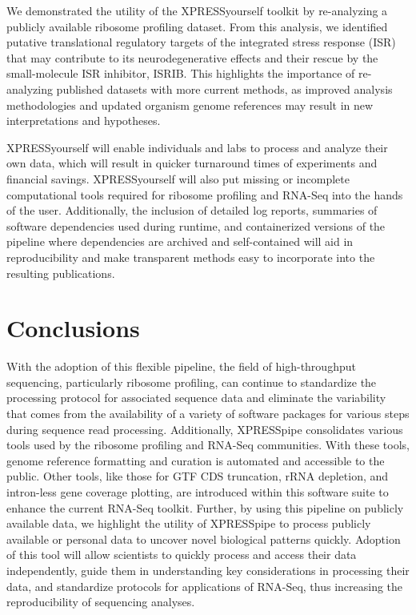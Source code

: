 \documentclass[10pt, oneside]{article}
\begin{document}
We demonstrated the utility of the XPRESSyourself toolkit by re-analyzing a publicly available ribosome profiling dataset. From this analysis, we identified putative translational regulatory targets of the integrated stress response (ISR) that may contribute to its neurodegenerative effects and their rescue by the small-molecule ISR inhibitor, ISRIB. This highlights the importance of re-analyzing published datasets with more current methods, as improved analysis methodologies and updated organism genome references may result in new interpretations and hypotheses. \par

XPRESSyourself will enable individuals and labs to process and analyze their own data, which will result in quicker turnaround times of experiments and financial savings. XPRESSyourself will also put missing or incomplete computational tools required for ribosome profiling and RNA-Seq into the hands of the user. Additionally, the inclusion of detailed log reports, summaries of software dependencies used during runtime, and containerized versions of the pipeline where dependencies are archived and self-contained will aid in reproducibility and make transparent methods easy to incorporate into the resulting publications. \par


\section{Conclusions}
With the adoption of this flexible pipeline, the field of high-throughput sequencing, particularly ribosome profiling, can continue to standardize the processing protocol for associated sequence data and eliminate the variability that comes from the availability of a variety of software packages for various steps during sequence read processing. Additionally, XPRESSpipe consolidates various tools used by the ribosome profiling and RNA-Seq communities. With these tools, genome reference formatting and curation is automated and accessible to the public. Other tools, like those for GTF CDS truncation, rRNA depletion, and intron-less gene coverage plotting, are introduced within this software suite to enhance the current RNA-Seq toolkit. Further, by using this pipeline on publicly available data, we highlight the utility of XPRESSpipe to process publicly available or personal data to uncover novel biological patterns quickly. Adoption of this tool will allow scientists to quickly process and access their data independently, guide them in understanding key considerations in processing their data, and standardize protocols for applications of RNA-Seq, thus increasing the reproducibility of sequencing analyses.
\end{document}
